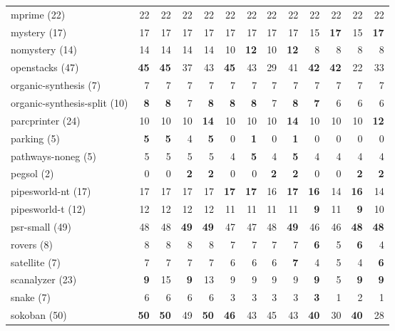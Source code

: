\begin{tabular}{l|rr:rr|rr:rr|rr:rr}
	mprime (22) & 22 & 22 & 22 & 22 & 22 & 22 & 22 & 22 & 22 & 22 & 22 & 22\\
	mystery (17) & 17 & 17 & 17 & 17 & 17 & 17 & 17 & 17 & 15 & \textbf{17}  & 15 & \textbf{17} \\
	nomystery (14) & 14 & 14 & 14 & 14 & 10 & \textbf{12}  & 10 & \textbf{12}  & 8 & 8 & 8 & 8\\
	openstacks (47) & \textbf{45}  & \textbf{45}  & 37 & 43 & \textbf{45}  & 43 & 29 & 41 & \textbf{42}  & \textbf{42}  & 22 & 33\\
	organic-synthesis (7) & 7 & 7 & 7 & 7 & 7 & 7 & 7 & 7 & 7 & 7 & 7 & 7\\
	organic-synthesis-split (10) & \textbf{8}  & \textbf{8}  & 7 & \textbf{8}  & \textbf{8}  & \textbf{8}  & 7 & \textbf{8}  & \textbf{7}  & 6 & 6 & 6\\
	parcprinter (24) & 10 & 10 & 10 & \textbf{14}  & 10 & 10 & 10 & \textbf{14}  & 10 & 10 & 10 & \textbf{12} \\
	parking (5) & \textbf{5}  & \textbf{5}  & 4 & \textbf{5}  & 0 & \textbf{1}  & 0 & \textbf{1}  & 0 & 0 & 0 & 0\\
	pathways-noneg (5) & 5 & 5 & 5 & 5 & 4 & \textbf{5}  & 4 & \textbf{5}  & 4 & 4 & 4 & 4\\
	pegsol (2) & 0 & 0 & \textbf{2}  & \textbf{2}  & 0 & 0 & \textbf{2}  & \textbf{2}  & 0 & 0 & \textbf{2}  & \textbf{2} \\
	pipesworld-nt (17) & 17 & 17 & 17 & 17 & \textbf{17}  & \textbf{17}  & 16 & \textbf{17}  & \textbf{16}  & 14 & \textbf{16}  & 14\\
	pipesworld-t (12) & 12 & 12 & 12 & 12 & 11 & 11 & 11 & 11 & \textbf{9}  & 11 & \textbf{9}  & 10\\
	psr-small (49) & 48 & 48 & \textbf{49}  & \textbf{49}  & 47 & 47 & 48 & \textbf{49}  & 46 & 46 & \textbf{48}  & \textbf{48} \\
	rovers (8) & 8 & 8 & 8 & 8 & 7 & 7 & 7 & 7 & \textbf{6}  & 5 & \textbf{6}  & 4\\
	satellite (7) & 7 & 7 & 7 & 7 & 6 & 6 & 6 & \textbf{7}  & 4 & 5 & 4 & \textbf{6} \\
	scanalyzer (23) & \textbf{9}  & 15 & \textbf{9}  & 13 & 9 & 9 & 9 & 9 & \textbf{9}  & 5 & \textbf{9}  & \textbf{9} \\
	snake (7) & 6 & 6 & 6 & 6 & 3 & 3 & 3 & 3 & \textbf{3}  & 1 & 2 & 1\\
	sokoban (50) & \textbf{50}  & \textbf{50}  & 49 & \textbf{50}  & \textbf{46}  & 43 & 45 & 43 & \textbf{40}  & 30 & \textbf{40}  & 28\\

\end{tabular}
